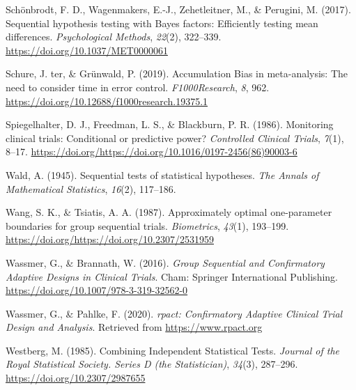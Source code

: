 \documentclass[
  english,
  ,jou, a4paper,floatsintext]{apa6}
\newlength{\cslhangindent}
\newenvironment{cslreferences}%
  {\setlength{\parindent}{0pt}%
  \everypar{\setlength{\hangindent}{\cslhangindent}}\ignorespaces}%
  {\par}
\begin{document}
\begin{cslreferences}
\leavevmode\hypertarget{ref-schonbrodt_sequential_2017}{}%
Schönbrodt, F. D., Wagenmakers, E.-J., Zehetleitner, M., \& Perugini, M. (2017). Sequential hypothesis testing with Bayes factors: Efficiently testing mean differences. \emph{Psychological Methods}, \emph{22}(2), 322--339. \url{https://doi.org/10.1037/MET0000061}

\leavevmode\hypertarget{ref-ter_schure_accumulation_2019}{}%
Schure, J. ter, \& Grünwald, P. (2019). Accumulation Bias in meta-analysis: The need to consider time in error control. \emph{F1000Research}, \emph{8}, 962. \url{https://doi.org/10.12688/f1000research.19375.1}

\leavevmode\hypertarget{ref-spiegelhalter_monitoring_1986}{}%
Spiegelhalter, D. J., Freedman, L. S., \& Blackburn, P. R. (1986). Monitoring clinical trials: Conditional or predictive power? \emph{Controlled Clinical Trials}, \emph{7}(1), 8--17. \url{https://doi.org/https://doi.org/10.1016/0197-2456(86)90003-6}

\leavevmode\hypertarget{ref-wald_sequential_1945}{}%
Wald, A. (1945). Sequential tests of statistical hypotheses. \emph{The Annals of Mathematical Statistics}, \emph{16}(2), 117--186.

\leavevmode\hypertarget{ref-wang_approximately_1987}{}%
Wang, S. K., \& Tsiatis, A. A. (1987). Approximately optimal one-parameter boundaries for group sequential trials. \emph{Biometrics}, \emph{43}(1), 193--199. \url{https://doi.org/https://doi.org/10.2307/2531959}

\leavevmode\hypertarget{ref-wassmer_group_2016}{}%
Wassmer, G., \& Brannath, W. (2016). \emph{Group Sequential and Confirmatory Adaptive Designs in Clinical Trials}. Cham: Springer International Publishing. \url{https://doi.org/10.1007/978-3-319-32562-0}

\leavevmode\hypertarget{ref-wassmer_rpact_2019}{}%
Wassmer, G., \& Pahlke, F. (2020). \emph{rpact: Confirmatory Adaptive Clinical Trial Design and Analysis}. Retrieved from \url{https://www.rpact.org}

\leavevmode\hypertarget{ref-westberg_combining_1985}{}%
Westberg, M. (1985). Combining Independent Statistical Tests. \emph{Journal of the Royal Statistical Society. Series D (the Statistician)}, \emph{34}(3), 287--296. \url{https://doi.org/10.2307/2987655}
\end{cslreferences}

\endgroup
\end{document}

